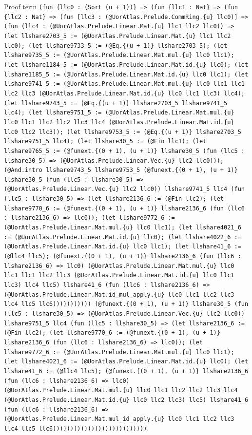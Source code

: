 \documentclass[11pt]{article}
\begin{document}
\noindent Proof term \texttt{(fun \{llc0 : (Sort (u + 1))\} => (fun \{llc1 : Nat\} => (fun \{llc2 : Nat\} => (fun [llc3 : (@UorAtlas.Prelude.CommRing.\{u\} llc0)] => (fun (llc4 : (@UorAtlas.Prelude.Linear.Mat.\{u\} llc1 llc2 llc0)) => (let llshare2703\_5 := (@UorAtlas.Prelude.Linear.Mat.\{u\} llc1 llc2 llc0); (let llshare9733\_5 := (@Eq.\{(u + 1)\} llshare2703\_5); (let llshare9735\_5 := (@UorAtlas.Prelude.Linear.Mat.mul.\{u\} llc0 llc1); (let llshare1184\_5 := (@UorAtlas.Prelude.Linear.Mat.id.\{u\} llc0); (let llshare1185\_5 := (@UorAtlas.Prelude.Linear.Mat.id.\{u\} llc0 llc1); (let llshare9741\_5 := (@UorAtlas.Prelude.Linear.Mat.mul.\{u\} llc0 llc1 llc1 llc2 llc3 (@UorAtlas.Prelude.Linear.Mat.id.\{u\} llc0 llc1 llc3) llc4); (let llshare9743\_5 := (@Eq.\{(u + 1)\} llshare2703\_5 llshare9741\_5 llc4); (let llshare9751\_5 := (@UorAtlas.Prelude.Linear.Mat.mul.\{u\} llc0 llc1 llc2 llc2 llc3 llc4 (@UorAtlas.Prelude.Linear.Mat.id.\{u\} llc0 llc2 llc3)); (let llshare9753\_5 := (@Eq.\{(u + 1)\} llshare2703\_5 llshare9751\_5 llc4); (let llshare30\_5 := (@Fin llc1); (let llshare9765\_5 := (@funext.\{(0 + 1), (u + 1)\} llshare30\_5 (fun (llc5 : llshare30\_5) => (@UorAtlas.Prelude.Linear.Vec.\{u\} llc2 llc0))); (@And.intro llshare9743\_5 llshare9753\_5 (@funext.\{(0 + 1), (u + 1)\} llshare30\_5 (fun (llc5 : llshare30\_5) => (@UorAtlas.Prelude.Linear.Vec.\{u\} llc2 llc0)) llshare9741\_5 llc4 (fun (llc5 : llshare30\_5) => (let llshare2136\_6 := (@Fin llc2); (let llshare9770\_6 := (@funext.\{(0 + 1), (u + 1)\} llshare2136\_6 (fun (llc6 : llshare2136\_6) => llc0)); (let llshare9772\_6 := (@UorAtlas.Prelude.Linear.Mat.mul.\{u\} llc0 llc1); (let llshare4021\_6 := (@UorAtlas.Prelude.Linear.Mat.id.\{u\} llc0); (let llshare4022\_6 := (@UorAtlas.Prelude.Linear.Mat.id.\{u\} llc0 llc1); (let llshare41\_6 := (@llc4 llc5); (@funext.\{(0 + 1), (u + 1)\} llshare2136\_6 (fun (llc6 : llshare2136\_6) => llc0) (@UorAtlas.Prelude.Linear.Mat.mul.\{u\} llc0 llc1 llc1 llc2 llc3 (@UorAtlas.Prelude.Linear.Mat.id.\{u\} llc0 llc1 llc3) llc4 llc5) llshare41\_6 (fun (llc6 : llshare2136\_6) => (@UorAtlas.Prelude.Linear.Mat.id\_mul\_apply.\{u\} llc0 llc1 llc2 llc3 llc4 llc5 llc6))))))))))) (@funext.\{(0 + 1), (u + 1)\} llshare30\_5 (fun (llc5 : llshare30\_5) => (@UorAtlas.Prelude.Linear.Vec.\{u\} llc2 llc0)) llshare9751\_5 llc4 (fun (llc5 : llshare30\_5) => (let llshare2136\_6 := (@Fin llc2); (let llshare9770\_6 := (@funext.\{(0 + 1), (u + 1)\} llshare2136\_6 (fun (llc6 : llshare2136\_6) => llc0)); (let llshare9772\_6 := (@UorAtlas.Prelude.Linear.Mat.mul.\{u\} llc0 llc1); (let llshare4021\_6 := (@UorAtlas.Prelude.Linear.Mat.id.\{u\} llc0); (let llshare41\_6 := (@llc4 llc5); (@funext.\{(0 + 1), (u + 1)\} llshare2136\_6 (fun (llc6 : llshare2136\_6) => llc0) (@UorAtlas.Prelude.Linear.Mat.mul.\{u\} llc0 llc1 llc2 llc2 llc3 llc4 (@UorAtlas.Prelude.Linear.Mat.id.\{u\} llc0 llc2 llc3) llc5) llshare41\_6 (fun (llc6 : llshare2136\_6) => (@UorAtlas.Prelude.Linear.Mat.mul\_id\_apply.\{u\} llc0 llc1 llc2 llc3 llc4 llc5 llc6)))))))))))))))))))))))))))}.\par
\end{document}
